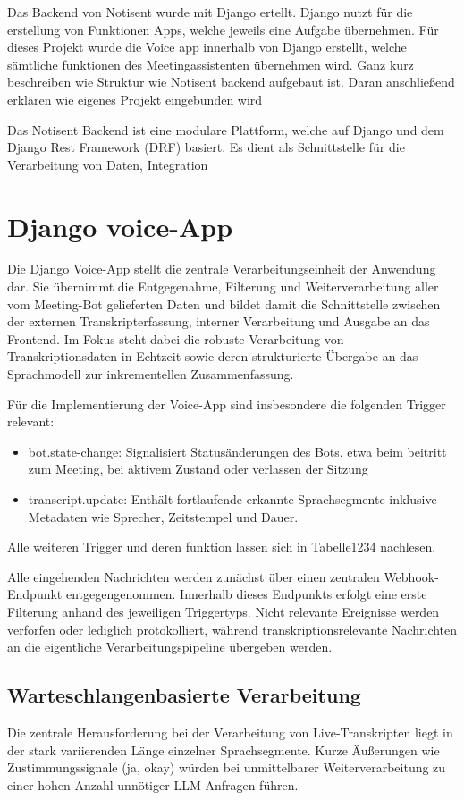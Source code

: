 Das Backend von Notisent wurde mit Django ertellt. Django nutzt für die erstellung von Funktionen Apps, welche jeweils eine Aufgabe übernehmen. Für dieses Projekt wurde die Voice app innerhalb von Django erstellt, welche sämtliche funktionen des Meetingassistenten übernehmen wird. 
Ganz kurz beschreiben wie Struktur wie Notisent backend aufgebaut ist. Daran anschließend erklären wie eigenes Projekt eingebunden wird

Das Notisent Backend ist eine modulare Plattform, welche auf Django und dem Django Rest Framework (DRF) basiert. Es dient als Schnittstelle für die Verarbeitung von Daten, Integration 

\section{Django voice-App}
Die Django Voice-App stellt die zentrale Verarbeitungseinheit der Anwendung dar. Sie übernimmt die Entgegenahme, Filterung und Weiterverarbeitung aller vom Meeting-Bot gelieferten Daten und bildet damit die Schnittstelle zwischen der externen Transkripterfassung, interner Verarbeitung und Ausgabe an das Frontend. Im Fokus steht dabei die robuste Verarbeitung von Transkriptionsdaten in Echtzeit sowie deren strukturierte Übergabe an das Sprachmodell zur inkrementellen Zusammenfassung. 

Für die Implementierung der Voice-App sind insbesondere die folgenden Trigger relevant: 
\begin{itemize}
    \item bot.state-change: Signalisiert Statusänderungen des Bots, etwa beim beitritt zum Meeting, bei aktivem Zustand oder verlassen der Sitzung
    \item transcript.update: Enthält fortlaufende erkannte Sprachsegmente inklusive Metadaten wie Sprecher, Zeitstempel und Dauer.
\end{itemize}
Alle weiteren Trigger und deren funktion lassen sich in Tabelle1234 nachlesen.

Alle eingehenden Nachrichten werden zunächst über einen zentralen Webhook-Endpunkt entgegengenommen. Innerhalb dieses Endpunkts erfolgt eine erste Filterung anhand des jeweiligen Triggertyps. Nicht relevante Ereignisse werden verforfen oder lediglich protokolliert, während transkriptionsrelevante Nachrichten an die eigentliche Verarbeitungspipeline übergeben werden. 

\subsection{Warteschlangenbasierte Verarbeitung}
Die zentrale Herausforderung bei der Verarbeitung von Live-Transkripten liegt in der stark variierenden Länge einzelner Sprachsegmente. Kurze Äußerungen wie Zustimmungssignale (ja, okay) würden bei unmittelbarer Weiterverarbeitung zu einer hohen Anzahl unnötiger LLM-Anfragen führen. 


